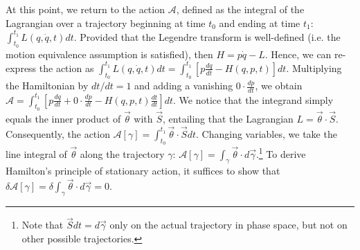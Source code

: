 \documentclass[letterpaper]{article}
\renewcommand{\vector}[1]{\ensuremath{\vec{#1}}} %
\newcommand{\integral}{\int}
\begin{document}
At this point, we return to the action $ \mathscr{A}$, defined as the integral of the Lagrangian over a trajectory beginning at time $t_0$ and ending at time $t_1$: $\integral^{t_1}_{t_0} L (q, \dot{q}, t) dt$. Provided that the Legendre transform is well-defined (i.e. the motion equivalence assumption is satisfied), then $H = p \dot{q} - L$. Hence, we can re-express the action as $\integral^{t_1}_{t_0} L (q, \dot{q}, t) dt = \integral^{t_1}_{t_0} [p \frac{dq}{dt} - H(q, p, t) ]dt$. Multiplying the Hamiltonian by $dt/dt = 1$ and adding a vanishing $0 \cdot \frac{dp}{dt}$, we obtain $ \mathscr{A} = \integral^{t_1}_{t_0} [p \frac{dq}{dt} + 0 \cdot \frac{dp}{dt} - H(q, p, t) \frac{dt}{dt} ]dt$. We notice that the integrand simply equals the inner product of $\vector{\theta}$ with $\vector{S} $, entailing that the Lagrangian $L =\vector{\theta} \cdot \vector{S} $. Consequently, the action $ \mathscr{A} [\gamma] = \integral^{t_1}_{t_0} \vector{\theta} \cdot \vector{S}  dt$. Changing variables, we take the line integral of $\vector{\theta}$ along the trajectory $\gamma $: $ \mathscr{A} [\gamma] =\integral_{\gamma} \vector{\theta} \cdot d\vector{\gamma}$.\footnote{Note that $\vector{S}  dt = d\vector{\gamma}$ only on the actual trajectory in phase space, but not on other possible trajectories.} To derive Hamilton's principle of stationary action, it suffices to show that $\delta \mathscr{A} [\gamma] =\delta \integral_{\gamma} \vector{\theta} \cdot d\vector{\gamma} = 0$. 
\end{document}
